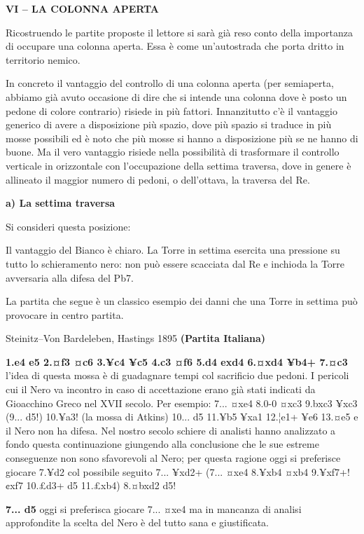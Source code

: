 \textbf{VI -- LA COLONNA APERTA}

Ricostruendo le partite proposte il lettore si sarà già reso conto della
importanza di occupare una colonna aperta. Essa è come un'autostrada che
porta dritto in territorio nemico.

In concreto il vantaggio del controllo di una colonna aperta (per
semiaperta, abbiamo già avuto occasione di dire che si intende una
colonna dove è posto un pedone di colore contrario) risiede in più
fattori. Innanzitutto c'è il vantaggio generico di avere a disposizione
più spazio, dove più spazio si traduce in più mosse possibili ed è noto
che più mosse si hanno a disposizione più se ne hanno di buone. Ma il
vero vantaggio risiede nella possibilità di trasformare il controllo
verticale in orizzontale con l'occupazione della settima traversa, dove
in genere è allineato il maggior numero di pedoni, o dell'ottava, la
traversa del Re.

\textbf{a) La settima traversa}

Si consideri questa posizione:


Il vantaggio del Bianco è chiaro. La Torre in settima esercita una
pressione su tutto lo schieramento nero: non può essere scacciata dal Re
e inchioda la Torre avversaria alla difesa del Pb7.

La partita che segue è un classico esempio dei danni che una Torre in
settima può provocare in centro partita.

Steinitz--Von Bardeleben, Hastings 1895 \textbf{(Partita Italiana)}

\textbf{1.e4 e5 2.¤f3 ¤c6 3.¥c4 ¥c5 4.c3 ¤f6 5.d4 exd4 6.¤xd4 ¥b4+
7.¤c3} l'idea di questa mossa è di guadagnare tempi col sacrificio due
pedoni. I pericoli cui il Nero va incontro in caso di accettazione erano
già stati indicati da Gioacchino Greco nel XVII secolo. Per esempio:
7... ¤xe4 8.0-0 ¤xc3 9.bxc3 ¥xc3 (9... d5!) 10.¥a3! (la mossa di Atkins)
10... d5 11.¥b5 ¥xa1 12.¦e1+ ¥e6 13.¤e5 e il Nero non ha difesa. Nel
nostro secolo schiere di analisti hanno analizzato a fondo questa
continuazione giungendo alla conclusione che le sue estreme conseguenze
non sono sfavorevoli al Nero; per questa ragione oggi si preferisce
giocare 7.¥d2 col possibile seguito 7... ¥xd2+ (7... ¤xe4 8.¥xb4 ¤xb4
9.¥xf7+! ¢xf7 10.£d3+ d5 11.£xb4) 8.¤bxd2 d5!

\textbf{7... d5} oggi si preferisca giocare 7... ¤xe4 ma in mancanza di
analisi approfondite la scelta del Nero è del tutto sana e giustificata.

